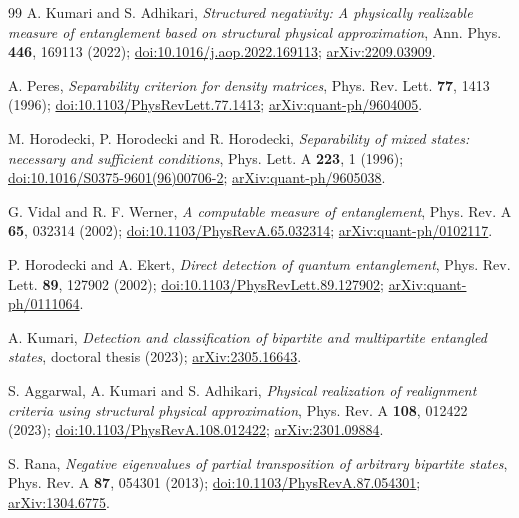 \documentclass[11pt,a4paper]{article}
\theoremstyle{definition}
\theoremstyle{plain}
\begin{document}
\clearpage
\begingroup\small
\begin{thebibliography}{99}
\setlength{\itemsep}{2pt}
A. Kumari and S. Adhikari,
\emph{Structured negativity: A physically realizable measure of entanglement
based on structural physical approximation},
Ann. Phys. \textbf{446}, 169113 (2022);
\href{https://doi.org/10.1016/j.aop.2022.169113}{doi:10.1016/j.aop.2022.169113};
\href{https://arxiv.org/abs/2209.03909}{arXiv:2209.03909}.

A. Peres,
\emph{Separability criterion for density matrices},
Phys. Rev. Lett. \textbf{77}, 1413 (1996);
\href{https://doi.org/10.1103/PhysRevLett.77.1413}{doi:10.1103/PhysRevLett.77.1413};
\href{https://arxiv.org/abs/quant-ph/9604005}{arXiv:quant-ph/9604005}.

M. Horodecki, P. Horodecki and R. Horodecki,
\emph{Separability of mixed states: necessary and sufficient conditions},
Phys. Lett. A \textbf{223}, 1 (1996);
\href{https://doi.org/10.1016/S0375-9601(96)00706-2}{doi:10.1016/S0375-9601(96)00706-2};
\href{https://arxiv.org/abs/quant-ph/9605038}{arXiv:quant-ph/9605038}.

G. Vidal and R. F. Werner,
\emph{A computable measure of entanglement},
Phys. Rev. A \textbf{65}, 032314 (2002);
\href{https://doi.org/10.1103/PhysRevA.65.032314}{doi:10.1103/PhysRevA.65.032314};
\href{https://arxiv.org/abs/quant-ph/0102117}{arXiv:quant-ph/0102117}.

P. Horodecki and A. Ekert,
\emph{Direct detection of quantum entanglement},
Phys. Rev. Lett. \textbf{89}, 127902 (2002);
\href{https://doi.org/10.1103/PhysRevLett.89.127902}{doi:10.1103/PhysRevLett.89.127902};
\href{https://arxiv.org/abs/quant-ph/0111064}{arXiv:quant-ph/0111064}.

A. Kumari,
\emph{Detection and classification of bipartite and multipartite entangled
states}, doctoral thesis (2023);
\href{https://arxiv.org/abs/2305.16643}{arXiv:2305.16643}.

S. Aggarwal, A. Kumari and S. Adhikari,
\emph{Physical realization of realignment criteria using structural physical
approximation},
Phys. Rev. A \textbf{108}, 012422 (2023);
\href{https://doi.org/10.1103/PhysRevA.108.012422}{doi:10.1103/PhysRevA.108.012422};
\href{https://arxiv.org/abs/2301.09884}{arXiv:2301.09884}.

S. Rana,
\emph{Negative eigenvalues of partial transposition of arbitrary bipartite
states},
Phys. Rev. A \textbf{87}, 054301 (2013);
\href{https://doi.org/10.1103/PhysRevA.87.054301}{doi:10.1103/PhysRevA.87.054301};
\href{https://arxiv.org/abs/1304.6775}{arXiv:1304.6775}.


\end{thebibliography}
\end{document}

